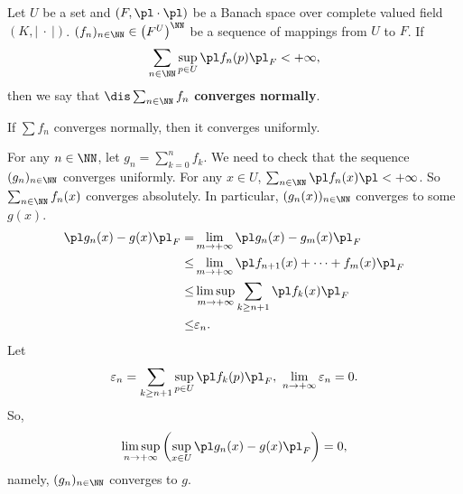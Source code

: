 \begin{definitionenv}
    Let $U$ be a set and $(F,\pl\cdot\pl)$ be a Banach space over complete valued field $(K,\left| \ \cdot\ \right|)$. $(f_n)_{n\in \NN}\in \left(F^U\right)^\NN$ be a sequence of mappings from $U$ to $F$. If 
    $$ \sum_{n\in \NN}\sup_{p\in U}\pl f_n(p)\pl_F<+\infty,$$
    then we say that $\dis \sum_{n\in \NN}f_n$ \textbf{converges normally}.
\end{definitionenv}
\begin{propositionenv}
    If $\sum f_n$ converges normally, then it converges uniformly.
\end{propositionenv}
\begin{proofenv}
    For any $n\in\NN$, let $g_n=\sum_{k=0}^{n} f_k$. We need to check that the sequence $(g_n)_{n\in\NN}$ converges uniformly. For any $x\in U$, $\sum_{n\in\NN}\pl f_n(x)\pl<+\infty$.
    So $\sum_{n\in\NN}f_n(x)$ converges absolutely. In particular, $(g_n(x))_{n\in\NN}$ converges to some $g(x)$.
    \begin{align*}
        \pl g_n(x)-g(x) \pl_F=&\lim_{m\rightarrow +\infty}\pl g_n(x)-g_m(x)\pl_F\\
        \le & \lim_{m\rightarrow +\infty}\pl f_{n+1}(x)+\dots +f_m(x)\pl_F\\
        \le & \limsup_{m\rightarrow +\infty}\sum_{k\ge n+1}\pl f_k(x)\pl_F\\
        \le & \varepsilon_n.
    \end{align*}
    Let 
    $$\varepsilon_n=\sum_{k\ge n+1}\sup_{p\in U}\pl f_k(p)\pl_F, \ \lim_{n\rightarrow +\infty}\varepsilon_n=0.$$
    So, 
    $$ \limsup_{n\rightarrow +\infty}\left(\sup_{x\in U} \pl g_n(x)-g(x)\pl_F\right)=0,$$
    namely, $(g_n)_{n\in\NN}$ converges to $g$.
\end{proofenv}
